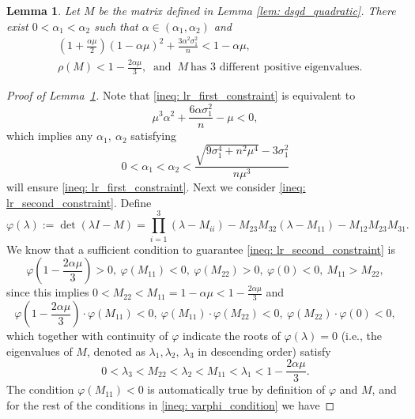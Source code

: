 \documentclass{article}
\theoremstyle{plain}
\newtheorem{lemma}[theorem]{Lemma}
\theoremstyle{definition}
\theoremstyle{remark}
\begin{document}
\begin{lemma}\label{ineq: stepsize_for_higp}
    Let $M$ be the matrix defined in Lemma \ref{lem: dsgd_quadratic}. There exist $0<\alpha_1<\alpha_2$ such that $\alpha\in (\alpha_1, \alpha_2)$ and
    \begin{align}
        &\left(1+\frac{\alpha\mu}{2}\right)(1-\alpha\mu)^2 + \frac{3\alpha^2\sigma_1^2}{n}<1-\alpha\mu, \label{ineq: lr_first_constraint}\\
        &\rho(M) < 1 - \frac{2\alpha\mu}{3},\ \text{ and }~M~\text{has 3 different positive eigenvalues.}  \label{ineq: lr_second_constraint}
    \end{align}
\end{lemma}
\begin{proof}[Proof of Lemma~\ref{ineq: stepsize_for_higp}]
    Note that \eqref{ineq: lr_first_constraint} is equivalent to
    \[
        \mu^3\alpha^2 + \frac{6\alpha\sigma_1^2}{n} - \mu < 0,
    \]
    which implies any $\alpha_1,\ \alpha_2$ satisfying
    \begin{equation}\label{ineq: alpha_for_first}
        0<\alpha_1<\alpha_2<\frac{\sqrt{9\sigma_1^4 + n^2\mu^4} - 3\sigma_1^2}{n\mu^3}
    \end{equation}
    will ensure \eqref{ineq: lr_first_constraint}. Next we consider \eqref{ineq: lr_second_constraint}. Define
    \[
        \varphi(\lambda) := \det(\lambda I - M) = \prod_{i=1}^{3}(\lambda - M_{ii}) - M_{23}M_{32}(\lambda - M_{11}) - M_{12}M_{23}M_{31}.
    \]
    We know that a sufficient condition to guarantee \eqref{ineq: lr_second_constraint} is
    \begin{equation}\label{ineq: varphi_condition}
        \varphi\left(1-\frac{2\alpha\mu}{3}\right) > 0,\ \varphi(M_{11}) < 0,\ \varphi(M_{22}) > 0,\ \varphi(0)< 0,\ M_{11} > M_{22},
    \end{equation}
    since this implies $0< M_{22}< M_{11} = 1-\alpha\mu < 1 - \frac{2\alpha\mu}{3}$ and
    \[
        \varphi\left(1-\frac{2\alpha\mu}{3}\right)\cdot \varphi(M_{11}) < 0,\ \varphi(M_{11})\cdot \varphi(M_{22}) < 0,\ \varphi(M_{22})\cdot \varphi(0) < 0,
    \]
    which together with continuity of $\varphi$ indicate the roots of $\varphi(\lambda)= 0$ (i.e., the eigenvalues of $M$, denoted as $\lambda_1, \lambda_2,\ \lambda_3$ in descending order) satisfy
    \[
        0< \lambda_3 < M_{22} < \lambda_2 < M_{11} < \lambda_1 < 1 - \frac{2\alpha\mu}{3}.
    \]
    The condition $\varphi(M_{11})<0$ is automatically true by definition of $\varphi$ and $M$, and for the rest of the conditions in \eqref{ineq: varphi_condition} we have

\end{proof}
\end{document}

